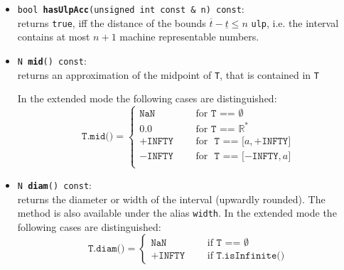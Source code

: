 \documentclass{report}
\newcommand{\Rs}{\mathbb{R}^*}
\newcommand{\INFTY}{\texttt{INFTY}}
\begin{document}
\begin{itemize}
			\item \texttt{bool {\bf hasUlpAcc}(unsigned int const \& n) const}:\\
				returns \texttt{true}, iff the
				distance of the bounds $\overline{t}
				-\underline{t} \leq n$ \texttt{ulp},
				i.e. the interval contains at most
				$n+1$ machine representable numbers.
	
			\item \texttt{N {\bf mid}() const}:\\ returns an
				approximation of the midpoint of
				\texttt{T}, that is contained in \texttt{T}
				
				In the extended mode the following
				cases are distinguished:
				\[
					\texttt{T.mid()} = \left\lbrace\begin{array}{lcl}
					\texttt{NaN}&\textrm{\ }&\textrm{for\ }\texttt{T == $\emptyset$}\\
					0.0&&\textrm{for\ }\texttt{T == $\Rs$}\\
					+\INFTY &&\textrm{for\ }\texttt{ T == [$a, +\INFTY$]}\\
					-\INFTY&&\textrm{for\ }\texttt{ T == [$-\INFTY, a$]}\\
					\end{array}\right.
				\]
			\item \texttt{N {\bf diam}() const}:\\ returns the
				diameter or width of the interval
				(upwardly rounded). The method is also
				available under the alias \texttt{width}.
				In the extended mode the following
				cases are distinguished:
				\[
					\texttt{T.diam()} = \left\lbrace\begin{array}{lcl}
					\texttt{NaN}&\textrm{\ }&\textrm{if\ }\texttt{T == $\emptyset$}\\
					+\INFTY &&\textrm{if } \texttt{T.isInfinite()} 
					\end{array}\right.
				\]



\end{itemize}
\end{document}
